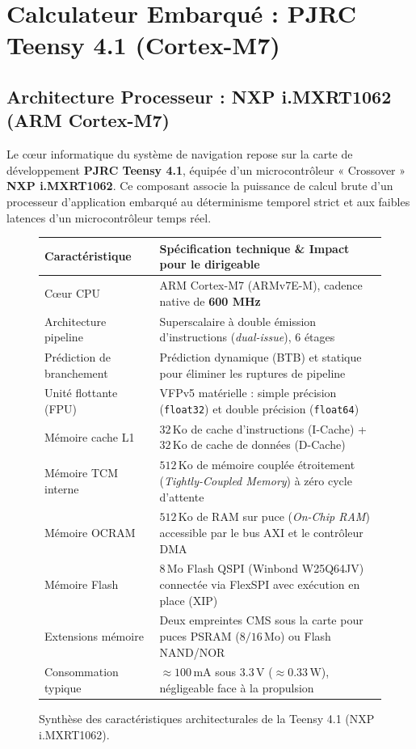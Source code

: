 \documentclass[../Materiel.tex]{subfiles}
\begin{document}
\section{Calculateur Embarqué : PJRC Teensy 4.1 (Cortex-M7)}

\subsection{Architecture Processeur : NXP i.MXRT1062 (ARM Cortex-M7)}

Le cœur informatique du système de navigation repose sur la carte de développement \textbf{PJRC Teensy 4.1}, équipée d'un microcontrôleur « Crossover » \textbf{NXP i.MXRT1062}. Ce composant associe la puissance de calcul brute d'un processeur d'application embarqué au déterminisme temporel strict et aux faibles latences d'un microcontrôleur temps réel.

\begin{figure}[htbp]
\centering
\small
\begin{tabular}{|l|p{10.5cm}|}
\hline
\textbf{Caractéristique} & \textbf{Spécification technique \& Impact pour le dirigeable} \\
\hline
Cœur CPU & ARM Cortex-M7 (ARMv7E-M), cadence native de \textbf{600 MHz} \\
Architecture pipeline & Superscalaire à double émission d'instructions (\textit{dual-issue}), 6 étages \\
Prédiction de branchement & Prédiction dynamique (BTB) et statique pour éliminer les ruptures de pipeline \\
Unité flottante (FPU) & VFPv5 matérielle : simple précision (\texttt{float32}) et double précision (\texttt{float64}) \\
Mémoire cache L1 & $32\,\text{Ko}$ de cache d'instructions (I-Cache) + $32\,\text{Ko}$ de cache de données (D-Cache) \\
Mémoire TCM interne & $512\,\text{Ko}$ de mémoire couplée étroitement (\textit{Tightly-Coupled Memory}) à zéro cycle d'attente \\
Mémoire OCRAM & $512\,\text{Ko}$ de RAM sur puce (\textit{On-Chip RAM}) accessible par le bus AXI et le contrôleur DMA \\
Mémoire Flash & $8\,\text{Mo}$ Flash QSPI (Winbond W25Q64JV) connectée via FlexSPI avec exécution en place (XIP) \\
Extensions mémoire & Deux empreintes CMS sous la carte pour puces PSRAM ($8/16\,\text{Mo}$) ou Flash NAND/NOR \\
Consommation typique & $\approx 100\,\text{mA}$ sous $3.3\,\text{V}$ ($\approx 0.33\,\text{W}$), négligeable face à la propulsion \\
\hline
\end{tabular}
\caption{Synthèse des caractéristiques architecturales de la Teensy 4.1 (NXP i.MXRT1062).}
\label{tab:teensy41_spec}
\end{figure}
\end{document}
